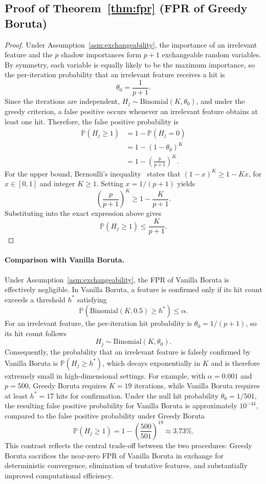 \documentclass[runningheads]{llncs}
\begin{document}
\subsection{Proof of Theorem~\ref{thm:fpr} (FPR of Greedy Boruta)}

\begin{proof}
Under Assumption~\ref{asm:exchangeability}, the importance of an irrelevant feature and the $p$ shadow importances form $p+1$ exchangeable random variables. By symmetry, each variable is equally likely to be the maximum importance, so the per-iteration probability that an irrelevant feature receives a hit is
$$
\theta_0 = \frac{1}{p+1}.
$$
Since the iterations are independent, $H_j \sim \mathrm{Binomial}(K,\theta_0)$, and under the greedy criterion, a false positive occurs whenever an irrelevant feature obtains at least one hit. Therefore, the false positive probability is
\begin{align}
\mathbb{P}(H_j \geq 1)
&= 1 - \mathbb{P}(H_j = 0) \nonumber \\
&= 1 - (1-\theta_0)^K \nonumber \\
&= 1 - \left(\frac{p}{p+1}\right)^K. \nonumber
\end{align}
For the upper bound, Bernoulli's inequality~\cite{mitrinovic1970analytic} states that $(1-x)^K \geq 1-Kx$, for $x \in [0,1]$ and integer $K \geq 1$. Setting $x = 1/(p+1)$ yields
$$
\left(\frac{p}{p+1}\right)^K \geq 1 - \frac{K}{p+1}.
$$
Substituting into the exact expression above gives
$$
\mathbb{P}(H_j \geq 1)
\leq \frac{K}{p+1}.
$$
\end{proof}

\paragraph{Comparison with Vanilla Boruta.}
Under Assumption~\ref{asm:exchangeability}, the FPR of Vanilla Boruta is effectively negligible. In Vanilla Boruta, a feature is confirmed only if its hit count exceeds a threshold \(h^*\) satisfying
\[
\mathbb{P}(\mathrm{Binomial}(K,0.5) \geq h^*) \leq \alpha.
\]
For an irrelevant feature, the per-iteration hit probability is \(\theta_0 = 1/(p+1)\), so its hit count follows
\[
H_j \sim \mathrm{Binomial}(K,\theta_0).
\]
Consequently, the probability that an irrelevant feature is falsely confirmed by Vanilla Boruta is $\mathbb{P}(H_j \geq h^*)$, which decays exponentially in \(K\) and is therefore extremely small in high-dimensional settings. For example, with \(\alpha = 0.001\) and \(p = 500\), Greedy Boruta requires \(K = 19\) iterations, while Vanilla Boruta requires at least \(h^* = 17\) hits for confirmation. Under the null hit probability \(\theta_0 = 1/501\), the resulting false positive probability for Vanilla Boruta is approximately \(10^{-44}\), compared to the false positive probability under Greedy Boruta
\[
\mathbb{P}(H_j \geq 1)
=
1 - \left(\frac{500}{501}\right)^{19}
\approx 3.73\%.
\]
This contrast reflects the central trade-off between the two procedures: Greedy Boruta sacrifices the near-zero FPR of Vanilla Boruta in exchange for deterministic convergence, elimination of tentative features, and substantially improved computational efficiency.
\end{document}
